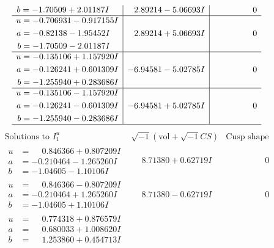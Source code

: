 \documentclass[1p]{elsarticle_modified}
\theoremstyle{definition}
\newcommand{\I}{\sqrt{-1}}
\begin{document}
$$\begin{array}{c|c|c}
\begin{aligned}
b &= -1.70509 + 2.01187 I\end{aligned}
 & \phantom{-}2.89214 - 5.06693 I & \phantom{-0.000000 } 0 \\ \hline\begin{aligned}
u &= -0.706931 - 0.917155 I \\
a &= -0.82138 - 1.95452 I \\
b &= -1.70509 - 2.01187 I\end{aligned}
 & \phantom{-}2.89214 + 5.06693 I & \phantom{-0.000000 } 0 \\ \hline\begin{aligned}
u &= -0.135106 + 1.157920 I \\
a &= -0.126241 + 0.601309 I \\
b &= -1.255940 + 0.283686 I\end{aligned}
 & -6.94581 - 5.02785 I & \phantom{-0.000000 } 0 \\ \hline\begin{aligned}
u &= -0.135106 - 1.157920 I \\
a &= -0.126241 - 0.601309 I \\
b &= -1.255940 - 0.283686 I\end{aligned}
 & -6.94581 + 5.02785 I & \phantom{-0.000000 } 0\\
 \hline 
 \end{array}$$\newpage$$\begin{array}{c|c|c}  
\text{Solutions to }I^u_{1}& \I (\text{vol} + \sqrt{-1}CS) & \text{Cusp shape}\\
 \hline 
\begin{aligned}
u &= \phantom{-}0.846366 + 0.807209 I \\
a &= -0.210464 - 1.265260 I \\
b &= -1.04605 - 1.10106 I\end{aligned}
 & \phantom{-}8.71380 + 0.62719 I & \phantom{-0.000000 } 0 \\ \hline\begin{aligned}
u &= \phantom{-}0.846366 - 0.807209 I \\
a &= -0.210464 + 1.265260 I \\
b &= -1.04605 + 1.10106 I\end{aligned}
 & \phantom{-}8.71380 - 0.62719 I & \phantom{-0.000000 } 0 \\ \hline\begin{aligned}
u &= \phantom{-}0.774318 + 0.876579 I \\
a &= \phantom{-}0.680033 + 1.008620 I \\
b &= \phantom{-}1.253860 + 0.454713 I\end{aligned}

\end{array}$$
\end{document}
